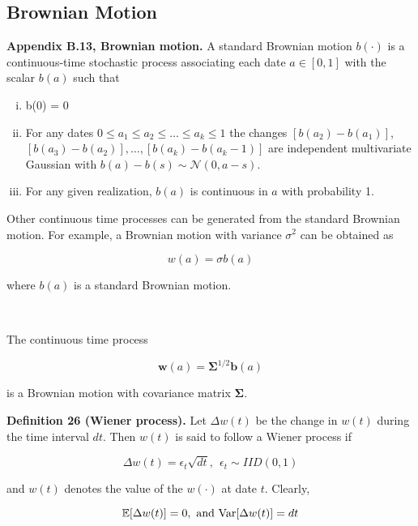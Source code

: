 \subsection{Brownian Motion}

%
\textbf{Appendix B.13, Brownian motion.} A standard Brownian motion \(b(\cdot)\) is a continuous-time stochastic process associating each date \(a \in [0, 1]\) with the scalar \(b(a)\) such that

\begin{enumerate}[(i)]

\item b(0) = 0

\item For any dates \(0 \leq a_1 \leq a_2 \leq \ldots \leq a_k \leq 1\) the changes \([b(a_2) - b(a_1)]\), \([b(a_3) - b(a_2)], \ldots, [b(a_k) - b(a_k - 1)]\) are independent multivariate Gaussian with \(b(a) - b(s) \sim \mathcal{N}(0, a -s)\). 

\item For any given realization, \(b(a)\) is continuous in \(a\) with probability 1.

\end{enumerate}

Other continuous time processes can be generated from the standard Brownian motion. For example, a Brownian motion with variance \(\sigma^2\) can be obtained as

\[
w(a) = \sigma b(a)
\]

where \(b(a)\) is a standard Brownian motion.

\

The continuous time process

\[
\boldsymbol{w}(a) = \boldsymbol{\Sigma}^{1/2} \boldsymbol{b}(a)
\]

is a Brownian motion with covariance matrix \(\boldsymbol{\Sigma}\).

\textbf{Definition 26 (Wiener process).} Let \(\Delta w(t)\) be the change in \(w(t)\) during the time interval \(dt\). Then \(w(t)\) is said to follow a Wiener process if

\[
\Delta w(t) = \epsilon_t \sqrt{dt}, \ \ \epsilon_t \sim IID(0, 1)
\]

and \(w(t)\) denotes the value of the \(w(\cdot)\) at date \(t\). Clearly,

\[
\E[\Delta w(t)] = 0, \text{ and } \Var[ \Delta w(t)] = dt
\]

